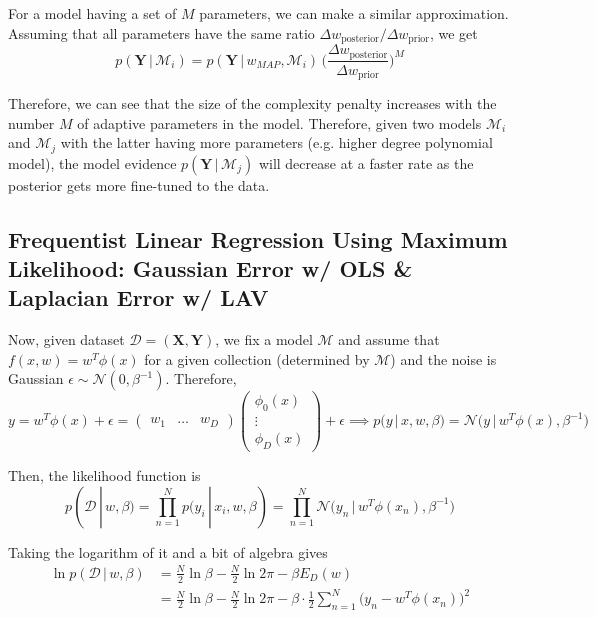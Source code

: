 \documentclass{article}
\begin{document}
    For a model having a set of $M$ parameters, we can make a similar approximation. Assuming that all parameters have the same ratio $\Delta w_{\text{posterior}}/\Delta w_{\text{prior}}$, we get
    \begin{equation}
      p(\mathbf{Y}\,|\,\mathcal{M}_i) = p(\mathbf{Y}\,|\, w_{MAP}, \mathcal{M}_i) \, \bigg(\frac{\Delta w_{\text{posterior}}}{\Delta w_{\text{prior}}} \bigg)^M
    \end{equation}

    Therefore, we can see that the size of the complexity penalty increases with the number $M$ of adaptive parameters in the model. Therefore, given two models $\mathcal{M}_i$ and $\mathcal{M}_j$ with the latter having more parameters (e.g. higher degree polynomial model), the model evidence $p(\mathbf{Y}\,|\,\mathcal{M}_j)$ will decrease at a faster rate as the posterior gets more fine-tuned to the data.

  \subsection{Frequentist Linear Regression Using Maximum Likelihood: Gaussian Error w/ OLS \& Laplacian Error w/ LAV}

    Now, given dataset $\mathcal{D} = (\mathbf{X}, \mathbf{Y})$, we fix a model $\mathcal{M}$ and assume that $f(x, w) = w^T \phi(x)$ for a given collection (determined by $\mathcal{M}$) and the noise is Gaussian $\epsilon \sim \mathcal{N}(0, \beta^{-1})$. Therefore,
    \begin{equation}
      y = w^T \phi(x) + \epsilon = \begin{pmatrix} w_1 & \ldots & w_D \end{pmatrix} \begin{pmatrix} \phi_0 (x) \\ \vdots \\ \phi_D (x) \end{pmatrix} + \epsilon \implies p(y\,|\,x, w, \beta) = \mathcal{N} \big(y\,|\, w^T \phi(x), \beta^{-1} \big)
    \end{equation}

    Then, the likelihood function is
    \begin{equation}
      p(\mathcal{D}\,|\,w, \beta) = \prod_{n=1}^N p(y_i\,|\,x_i, w, \beta) = \prod_{n=1}^N \mathcal{N}\big( y_n \,|\, w^T \phi(x_n), \beta^{-1} \big)
    \end{equation}

    Taking the logarithm of it and a bit of algebra gives
    \begin{align*}
      \ln p(\mathcal{D}\,|\,w, \beta) & = \frac{N}{2} \ln{\beta} - \frac{N}{2} \ln{2\pi} - \beta E_D (w)\\
      & = \frac{N}{2} \ln{\beta} - \frac{N}{2} \ln{2\pi} - \beta \cdot \frac{1}{2} \sum_{n=1}^N \big(y_n - w^T \phi(x_n)\big)^2
    \end{align*}
\end{document}
